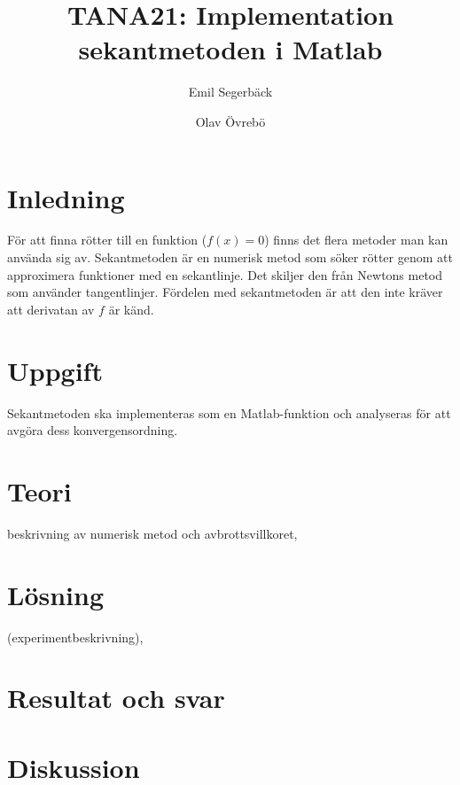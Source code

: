 \documentclass{report}
\title{TANA21: Implementation sekantmetoden i Matlab}
\author{Emil Segerbäck \and Olav Övrebö}
\begin{document}
\maketitle

\section{Inledning}
För att finna rötter till en funktion ($f(x) = 0$) finns det flera metoder man kan använda sig av. Sekantmetoden är en numerisk metod som söker rötter genom att approximera funktioner med en sekantlinje. Det skiljer den från Newtons metod som använder tangentlinjer. Fördelen med sekantmetoden är att den inte kräver att derivatan av $f$ är känd.

\section{Uppgift}
Sekantmetoden ska implementeras som en Matlab-funktion och analyseras för att avgöra dess konvergensordning.

\section{Teori}
beskrivning av numerisk metod och avbrottsvillkoret,

\section{Lösning}
(experimentbeskrivning),

\section{Resultat och svar}

\section{Diskussion}
\end{document}
